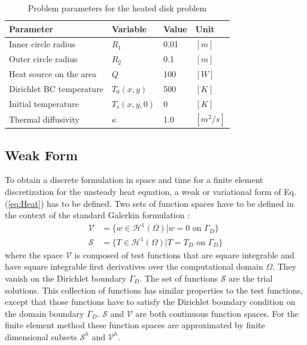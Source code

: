\documentclass[a4paper, 11pt, oneside]{scrartcl}
\newcommand{\refEq}[1]{Eq. (\ref{#1})}
\begin{document}
\renewcommand{\arraystretch}{2}
\begin{table}[h!]
	\begin{center}
		\begin{tabular}{ p{5cm} p{2cm} p{1.5cm} p{1.5cm}}
			\toprule
			Parameter & Variable & Value & Unit\\
			\hline
			Inner circle radius & $R_1$ & 0.01 & $[m]$\\
			Outer circle radius & $R_2$ & 0.1 & $[m]$\\
			Heat source on the area & $Q$ & 100 & $[W]$\\
			Dirichlet BC temperature & $T_0(x,y)$ & 500 & $[K]$\\
			Initial temperature & $T_s(x,y,0)$ & 0 & $[K]$\\
			Thermal diffusivity & $\kappa$ & 1.0 & $[m^2/s]$\\
			\bottomrule
		\end{tabular}
		\caption{\label{tab:parameters} Problem parameters for the heated disk problem}
	\end{center}
\end{table}
\renewcommand{\arraystretch}{1}

\subsection{Weak Form}

To obtain a discrete formulation in space and time for a finite element discretization for the unsteady heat equation, a weak or variational form of \refEq{eq:Heat} has to be defined. Two sets of function spaces have to be defined in the context of the standard Galerkin formulation \cite{doneaFiniteElementMethods2003}:
\begin{align}
	\mathcal{V} &= \{w \in \mathcal{H}^1(\Omega) | w = 0 \text{ on } \Gamma_D\}\\
	\mathcal{S} &= \{T \in \mathcal{H}^1(\Omega) | T = T_D \text{ on } \Gamma_D\}
\end{align}
where the space $\mathcal{V}$ is composed of test functions that are square integrable and have square integrable first derivatives over the computational domain $\Omega$. They vanish on the Dirichlet boundary $\Gamma_D$. The set of functions $\mathcal{S}$ are the trial solutions. This collection of functions has similar properties to the test functions, except that those functions have to satisfy the Dirichlet boundary condition on the domain boundary $\Gamma_D$. $\mathcal{S}$ and $\mathcal{V}$ are both continuous function spaces. For the finite element method these function spaces are approximated by finite dimensional subsets $\mathcal{S}^h$ and $\mathcal{V}^h$.
\end{document}
